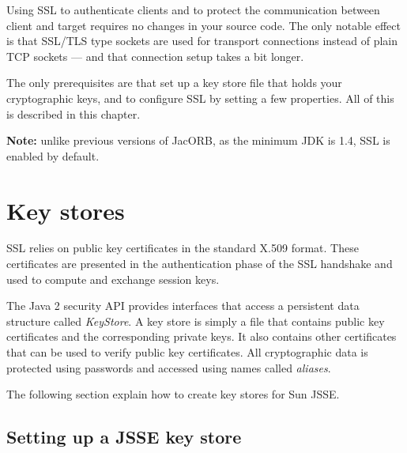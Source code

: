 

Using  SSL to authenticate  clients and  to protect  the communication
between client and target requires no changes in your source code. The
only  notable  effect  is  that  SSL/TLS type  sockets  are  used  for
transport  connections  instead of  plain  TCP  sockets  --- and  that
connection setup takes a bit longer.

The only  prerequisites are that set up  a key  store file that  holds your
cryptographic   keys,  and  to   configure  SSL   by  setting   a  few
properties. All of this is described in this chapter.

\textbf{Note:} unlike previous versions of JacORB, as the minimum JDK is 1.4, SSL
is enabled by default.

\section{Key stores}

SSL  relies   on  public  key  certificates  in   the  standard  X.509
format. These  certificates are presented in  the authentication phase
of the  SSL handshake and used  to compute and  exchange session keys.

The Java 2  security API provides interfaces that  access a persistent
data structure  called {\em  KeyStore}. A key  store is simply  a file
that contains  public key  certificates and the  corresponding private
keys. It also  contains other certificates that can  be used to verify
public key  certificates.  All  cryptographic data is  protected using
passwords and accessed using names called {\em aliases}.

The following section explain how to create key stores for Sun JSSE.


\subsection{Setting up a JSSE key store}

